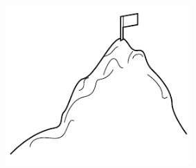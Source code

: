 \documentclass[11pt,letterpaper,twoside]{report}
\begin{document}
\vspace{\fill}
\begin{flushright}
\includegraphics[height=6cm]{resources/learning_curve_abstract.pdf}
\end{flushright}
\vspace*{\fill}
\end{document}
